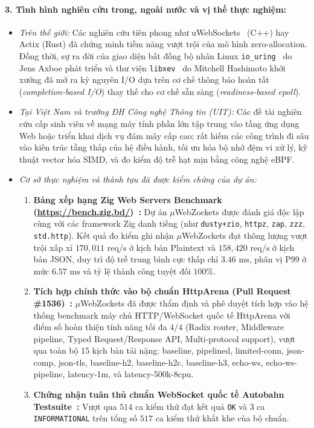 \documentclass[letterpaper]{article}
\begin{document}
\paragraph{3. Tình hình nghiên cứu trong, ngoài nước và vị thế thực nghiệm:}
\begin{itemize}
    \item \textit{Trên thế giới:} Các nghiên cứu tiên phong như uWebSockets~\cite{uwebsockets} (C++) hay Actix (Rust) đã chứng minh tiềm năng vượt trội của mô hình zero-allocation. Đồng thời, sự ra đời của giao diện bất đồng bộ nhân Linux \texttt{io\_uring}~\cite{io_uring} do Jens Axboe phát triển và thư viện \texttt{libxev}~\cite{libxev} do Mitchell Hashimoto khởi xướng đã mở ra kỷ nguyên I/O dựa trên cơ chế thông báo hoàn tất (\emph{completion-based I/O}) thay thế cho cơ chế sẵn sàng (\emph{readiness-based epoll}).
    \item \textit{Tại Việt Nam và trường ĐH Công nghệ Thông tin (UIT):} Các đề tài nghiên cứu cấp sinh viên về mạng máy tính phần lớn tập trung vào tầng ứng dụng Web hoặc triển khai dịch vụ đám mây cấp cao; rất hiếm các công trình đi sâu vào kiến trúc tầng thấp của hệ điều hành, tối ưu hóa bộ nhớ đệm vi xử lý, kỹ thuật vector hóa SIMD, và đo kiểm độ trễ hạt mịn bằng công nghệ eBPF.
    \item \textit{Cơ sở thực nghiệm và thành tựu đã được kiểm chứng của dự án:}
    \begin{enumerate}
        \item \textbf{Bảng xếp hạng Zig Web Servers Benchmark (\url{https://bench.zig.bd/})~\cite{bench_zig_bd}:} Dự án $\mu$WebZockets được đánh giá độc lập cùng với các framework Zig danh tiếng (như \texttt{dusty+zio}, \texttt{httpz}, \texttt{zap}, \texttt{zzz}, \texttt{std.http}). Kết quả đo kiểm ghi nhận $\mu$WebZockets đạt thông lượng vượt trội xấp xỉ $170{,}011\text{ req/s}$ ở kịch bản Plaintext và $158{,}420\text{ req/s}$ ở kịch bản JSON, duy trì độ trễ trung bình cực thấp chỉ $3.46\text{ ms}$, phân vị P99 ở mức $6.57\text{ ms}$ và tỷ lệ thành công tuyệt đối $100\%$.
        \item \textbf{Tích hợp chính thức vào bộ chuẩn HttpArena (Pull Request \#1536)~\cite{httparena_pr1536}:} $\mu$WebZockets đã được thẩm định và phê duyệt tích hợp vào hệ thống benchmark máy chủ HTTP/WebSocket quốc tế HttpArena với điểm số hoàn thiện tính năng tối đa $4/4$ (Radix router, Middleware pipeline, Typed Request/Response API, Multi-protocol support), vượt qua toàn bộ 15 kịch bản tải nặng: baseline, pipelined, limited-conn, json-comp, json-tls, baseline-h2, baseline-h2c, baseline-h3, echo-ws, echo-ws-pipeline, latency-1m, và latency-500k-8cpu.
        \item \textbf{Chứng nhận tuân thủ chuẩn WebSocket quốc tế Autobahn Testsuite~\cite{autobahn}:} Vượt qua $514$ ca kiểm thử đạt kết quả \texttt{OK} và $3$ ca \texttt{INFORMATIONAL} trên tổng số $517$ ca kiểm thử khắt khe của bộ chuẩn.
    \end{enumerate}
\end{itemize}
\end{document}
